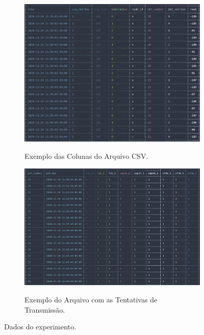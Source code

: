 \begin{figure}[h]
      \centering
      \begin{subfigure}{.4\textwidth}
            \centering
            \caption{Exemplo das Colunas do Arquivo CSV.}
            \includegraphics[width=\textwidth]{./sections/textual/chapters/images/csv_example.png}
            \label{fig:csv_example}
      \end{subfigure}
      \begin{subfigure}{.4\textwidth}
            \centering
            \caption{Exemplo do Arquivo com as Tentativas de Transmissão.}
            \includegraphics[width=\textwidth]{./sections/textual/chapters/images/second_csv_example.png}
            \label{fig:second_csv_example}
      \end{subfigure}
      \caption{Dados do experimento.}
      \label{fig:test}
\end{figure}


